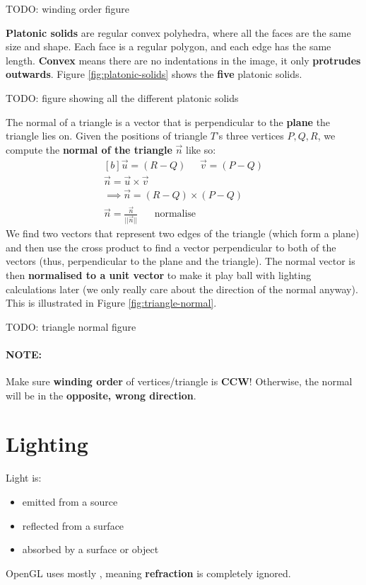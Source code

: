 \documentclass{article}
\begin{document}
TODO: winding order figure

\textbf{Platonic solids} are regular convex polyhedra, where all the faces are the same size and shape. Each face is a regular polygon, and each edge has the same length. \textbf{Convex} means there are no indentations in the image, it only \textbf{protrudes outwards}. Figure \ref{fig:platonic-solids} shows the \textbf{five} platonic solids.

TODO: figure showing all the different platonic solids

The normal of a triangle is a vector that is perpendicular to the \textbf{plane} the triangle lies on. Given the positions of triangle $T$'s three vertices $P, Q, R$, we compute the \textbf{normal of the triangle} $\vec{n}$ like so:
\begin{equation}
	\begin{aligned}[b]
	\vec{u} = (R - Q) \;\;\;\;\; \vec{v} = (P - Q) \\
	\vec{n} = \vec{u} \times \vec{v} \\
	\implies \vec{n} = (R - Q) \times (P - Q) \\
	\vec{n} = \frac{\vec{n}}{||\vec{n}||} \;\;\;\;\;\; \text{normalise}
	\end{aligned}
	\label{eq:triangle-normal}
\end{equation}
We find two vectors that represent two edges of the triangle (which form a plane) and then use the cross product to find a vector perpendicular to both of the vectors (thus, perpendicular to the plane and the triangle). The normal vector is then \textbf{normalised to a unit vector} to make it play ball with lighting calculations later (we only really care about the direction of the normal anyway). This is illustrated in Figure \ref{fig:triangle-normal}.

TODO: triangle normal figure

\paragraph{\textbf{NOTE: }}Make sure \textbf{winding order} of vertices/triangle is \textbf{CCW}! Otherwise, the normal will be in the \textbf{opposite, wrong direction}.

\section{Lighting}

Light is:
\begin{itemize}
	\item emitted from a source
	\item reflected from a surface
	\item absorbed by a surface or object
\end{itemize}
OpenGL uses mostly , meaning \textbf{refraction} is completely ignored.
\end{document}
